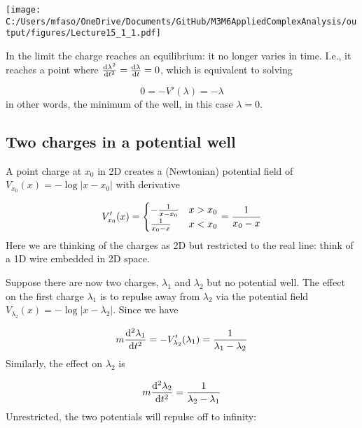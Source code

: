 \documentclass[12pt,a4paper]{article}
\def\D{ {\rm d} }
\def\dt{\D t}
\begin{document}
\texttt{[image: C:/Users/mfaso/OneDrive/Documents/GitHub/M3M6AppliedComplexAnalysis/output/figures/Lecture15\_1\_1.pdf]}

In the limit the charge reaches an equilibrium: it no longer varies in time. I.e., it reaches a point where ${ \D \lambda^2 \over \dt^2} = { \D \lambda \over \dt}  = 0$, which is equivalent to solving

\[
 0 = - V'(\lambda)  = - \lambda
\]
in other words, the minimum of the well, in this case $\lambda = 0$.

\subsection{Two charges in a potential well}
A point charge at $x_0$ in 2D creates a (Newtonian) potential field of $V_{x_0}(x) = -\log|x - x_0|$ with derivative

\[
V_{x_0}'(x) = \begin{cases} -{1 \over x - x_0} & x > x_0 \\
        {1 \over x_0 - x} & x < x_0
\end{cases} = {1 \over x_0 - x}
\]
Here we are thinking of the charges as 2D but restricted to the real line: think of a 1D wire embedded in 2D space.

Suppose there are now two charges, $\lambda_1$ and $\lambda_2$ but no potential well.  The effect on the first charge $\lambda_1$ is to repulse away from $\lambda_2$ via the potential field $V_{\lambda_2}(x) = -\log|x - \lambda_2|$. Since we have

\[
m {\D^2 \lambda_1 \over \D t^2} = - V_{\lambda_2}'(\lambda_1) =  {1 \over \lambda_1 -\lambda_2}
\]
Similarly, the effect on $\lambda_2$ is

\[
m {\D^2 \lambda_2 \over \D t^2} = {1 \over \lambda_2 -\lambda_1}
\]
Unrestricted, the two potentials will repulse off to infinity:
\end{document}

